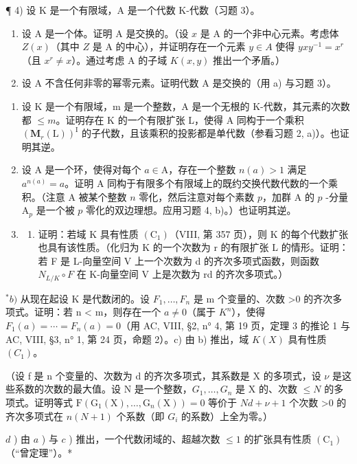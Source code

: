 ¶ 4) 设 K 是一个有限域，A 是一个代数 K-代数（习题 3）。

\begin{enumerate}
\def\labelenumi{\alph{enumi})}
\item
  设 A 是一个体。证明 A 是交换的。（设 \(x\) 是 A 的一个非中心元素。考虑体 \(Z(x)\)（其中 \(Z\) 是 A 的中心），并证明存在一个元素 \(y \in A\) 使得 \(yxy^{-1} = x^r\)（且 \(x^r \neq x\)）。通过考虑 A 的子域 \(K(x,y)\) 推出一个矛盾。）
\item
  设 A 不含任何非零的幂零元素。证明代数 A 是交换的（用 a) 与习题 3）。
\end{enumerate}

\begin{enumerate}
\def\labelenumi{\arabic{enumi})}
\setcounter{enumi}{4}
\item
  设 K 是一个有限域，m 是一个整数，A 是一个无根的 K-代数，其元素的次数都 \(\leqslant m\)。证明存在 K 的一个有限扩张 L，使得 A 同构于一个乘积 \((\mathbf{M}_{r}(\mathrm{L}))^{\mathrm{I}}\) 的子代数，且该乘积的投影都是单代数（参看习题 2, a)）。也证明其逆。
\item
  设 A 是一个环，使得对每个 \(a \in \mathrm{A}\)，存在一个整数 \(n(a) > 1\) 满足 \(a^{n(a)} = a\)。证明 A 同构于有限多个有限域上的既约交换代数代数的一个乘积。（注意 A 被某个整数 \(n\) 零化，然后注意对每个素数 \(p\)，加群 A 的 \(p\) -分量 \(\mathrm{A}_p\) 是一个被 \(p\) 零化的双边理想。应用习题 4, b)。）也证明其逆。
\item
  \begin{enumerate}
  \def\labelenumii{\alph{enumii})}
  \tightlist
  \item
    证明：若域 K 具有性质 \((\mathrm{C}_{1})\)（VIII, 第 357 页），则 K 的每个代数扩张也具有该性质。（化归为 K 的一个次数为 r 的有限扩张 L 的情形。证明：若 F 是 L-向量空间 V 上一个次数为 d 的齐次多项式函数，则函数 \(N_{L/K} \circ F\) 在 K-向量空间 V 上是次数为 rd 的齐次多项式。）
  \end{enumerate}
\end{enumerate}

\(^{*}b)\) 从现在起设 K 是代数闭的。设 \(F_{1},\ldots,F_{n}\) 是 m 个变量的、次数 \textgreater0 的齐次多项式。证明：若 n \textless{} m，则存在一个 \(a \neq 0\)（属于 \(K^{n}\)），使得 \(F_{1}(a) = \cdots = F_{n}(a) = 0\)（用 AC, VIII, §2, n° 4, 第 19 页，定理 3 的推论 1 与 AC, VIII, §3, n° 1, 第 24 页，命题 2）。c) 由 b) 推出，域 \(K(X)\) 具有性质 \((C_{1})\)。

（设 f 是 n 个变量的、次数为 d 的齐次多项式，其系数是 X 的多项式，设 \(\nu\) 是这些系数的次数的最大值。设 N 是一个整数，\(G_{1},\ldots,G_{n}\) 是 X 的、次数 \(\leqslant N\) 的多项式。证明等式 \(\mathrm{F}(\mathrm{G}_{1}(\mathrm{X}),\ldots,\mathrm{G}_{n}(\mathrm{X}))=0\) 等价于 \(Nd+\nu+1\) 个次数 \textgreater0 的齐次多项式在 \(n(N+1)\) 个系数（即 \(G_{i}\) 的系数）上全为零。）

\(d\) ) 由 \(a\) ) 与 \(c\) ) 推出，一个代数闭域的、超越次数 \(\leqslant 1\) 的扩张具有性质 \((\mathrm{C}_1)\)（``曾定理''）。*

